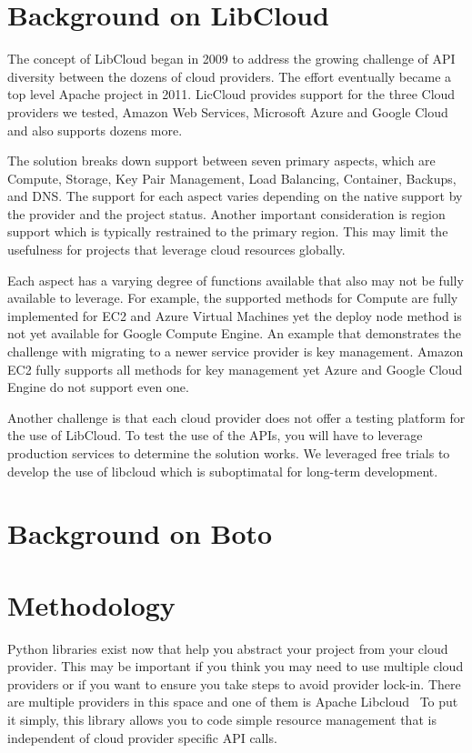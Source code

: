\section{Background on LibCloud}

The concept of LibCloud began in 2009 to address the growing challenge of API diversity
between the dozens of cloud providers. The effort eventually became a top level Apache 
project in 2011. LicCloud provides support for the three Cloud providers we tested, 
Amazon Web Services, Microsoft Azure and Google Cloud and also supports dozens more.

The solution breaks down support between seven primary aspects, which are Compute, 
Storage, Key Pair Management, Load Balancing, Container, Backups, and DNS. The support
for each aspect varies depending on the native support by the provider and the project
status. Another important consideration is region support which is typically restrained
to the primary region. This may limit the usefulness for projects that leverage cloud
resources globally.

Each aspect has a varying degree of functions available that also may not be fully 
available to leverage. For example, the supported methods for Compute are fully 
implemented for EC2 and Azure Virtual Machines yet the deploy node method is not yet
available for Google Compute Engine. An example that demonstrates the challenge with
migrating to a newer service provider is key management. Amazon EC2 fully supports all 
methods for key management yet Azure and Google Cloud Engine do not support even one.

Another challenge is that each cloud provider does not offer a testing platform for the
use of LibCloud. To test the use of the APIs, you will have to leverage production 
services to determine the solution works. We leveraged free trials to develop the use 
of libcloud which is suboptimatal for long-term development.

\section{Background on Boto}

\section{Methodology}

Python libraries exist now that help you abstract your project from  your cloud provider. 
This may be important if you think you may need to use multiple cloud providers or if you 
want to ensure you take steps to avoid provider lock-in. There are multiple providers in 
this space and one of them is Apache Libcloud~\cite{hid-sp18-518-LibCloud} To put it 
simply, this library allows you to code simple resource  management that is independent 
of cloud provider specific API calls.

